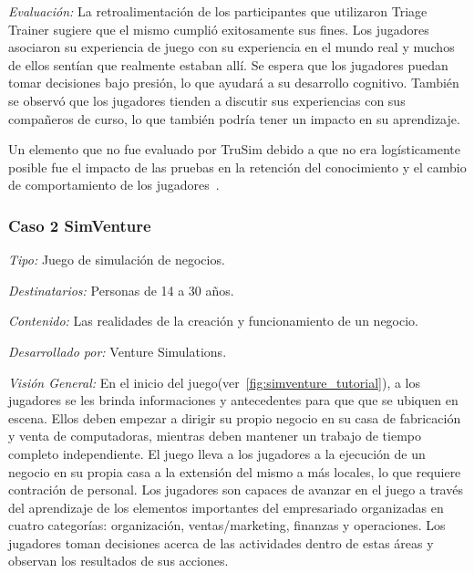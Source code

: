 \emph{Evaluación: } La retroalimentación de los participantes que utilizaron
Triage Trainer sugiere que el mismo cumplió exitosamente sus fines. Los
jugadores asociaron su experiencia de juego con su experiencia en el mundo real
y muchos de ellos sentían que realmente estaban allí. Se espera que los
jugadores puedan tomar decisiones bajo presión, lo que ayudará a su desarrollo
cognitivo. También se observó que los jugadores tienden a discutir sus
experiencias con sus compañeros de curso, lo que también podría tener un impacto
en su aprendizaje.

Un elemento que no fue evaluado por TruSim debido a que no era logísticamente
posible fue el impacto de las pruebas en la retención del conocimiento y el
cambio de comportamiento de los jugadores~\cite{education:games}. 


\subsubsection{Caso 2 SimVenture}

\emph{Tipo: } Juego de simulación de negocios.

\emph{Destinatarios: } Personas de 14 a 30 años.

\emph{Contenido: } Las realidades de la creación y funcionamiento de un negocio.

\emph{Desarrollado por: } Venture Simulations.

\emph{Visión General: } En el inicio del
juego(ver~\ref{fig:simventure_tutorial}), a los jugadores se les brinda
informaciones y antecedentes para que que se ubiquen en escena. Ellos deben
empezar a dirigir su propio negocio en su casa de fabricación y venta de
computadoras, mientras deben mantener un trabajo de tiempo completo
independiente. El juego lleva a los jugadores a la ejecución de un negocio en su
propia casa a la extensión del mismo a más locales, lo que requiere contración
de personal. Los jugadores son capaces de avanzar en el juego a través del
aprendizaje de los elementos importantes del empresariado organizadas en cuatro
categorías: organización, ventas/marketing, finanzas y operaciones. Los
jugadores toman decisiones acerca de las actividades dentro de estas áreas y
observan los resultados de sus acciones. 

